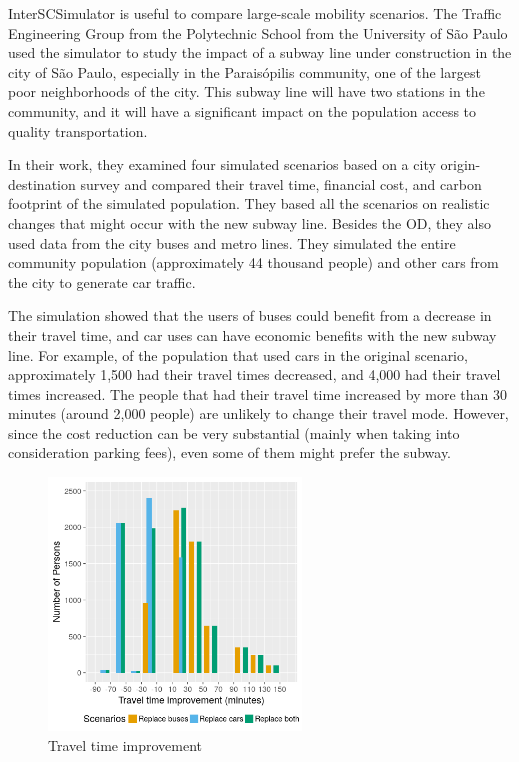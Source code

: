 InterSCSimulator is useful to compare large-scale mobility scenarios. The Traffic Engineering Group from the Polytechnic School from the University of S\~ao Paulo used the simulator to study the impact of a subway line under construction in the city of S\~ao Paulo, especially in the Paraisópilis community, one of the largest poor neighborhoods of the city. This subway line will have two stations in the community, and it will have a significant impact on the population access to quality transportation.

In their work, they examined four simulated scenarios based on a city origin-destination survey and compared their travel time, financial cost, and carbon footprint of the simulated population. They based all the scenarios on realistic changes that might occur with the new subway line. Besides the OD, they also used data from the city buses and metro lines. They simulated the entire community population (approximately 44 thousand people) and other cars from the city to generate car traffic.

The simulation showed that the users of buses could benefit from a decrease in their travel time, and car uses can have economic benefits with the new subway line. For example, of the population that used cars in the original scenario, approximately 1,500 had their travel times decreased, and 4,000 had their travel times increased. The people that had their travel time increased by more than 30 minutes (around 2,000 people) are unlikely to change their travel mode. However, since the cost reduction can be very substantial (mainly when taking into consideration parking fees), even some of them might prefer the subway.

\begin{figure}[!htb]
\centering
\includegraphics[width=0.6\textwidth]{figuras/chap-uses/hist_travel_time.png}
\caption{Travel time improvement}
\label{fig:travel_time}
\end{figure}

